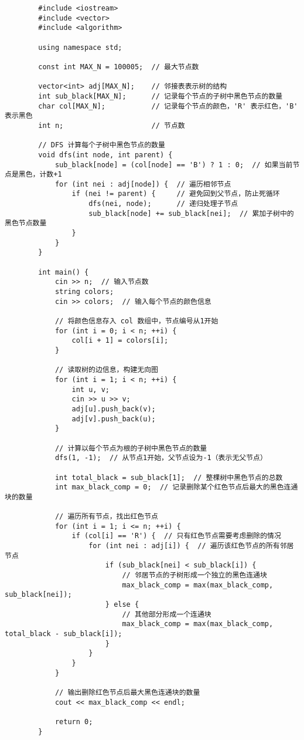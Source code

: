 \documentclass[a4paper]{ctexart}
\begin{document}
	\begin{lstlisting}
		#include <iostream>
		#include <vector>
		#include <algorithm>
		
		using namespace std;
		
		const int MAX_N = 100005;  // 最大节点数
		
		vector<int> adj[MAX_N];    // 邻接表表示树的结构
		int sub_black[MAX_N];      // 记录每个节点的子树中黑色节点的数量
		char col[MAX_N];           // 记录每个节点的颜色，'R' 表示红色，'B' 表示黑色
		int n;                     // 节点数
		
		// DFS 计算每个子树中黑色节点的数量
		void dfs(int node, int parent) {
			sub_black[node] = (col[node] == 'B') ? 1 : 0;  // 如果当前节点是黑色，计数+1
			for (int nei : adj[node]) {  // 遍历相邻节点
				if (nei != parent) {     // 避免回到父节点，防止死循环
					dfs(nei, node);      // 递归处理子节点
					sub_black[node] += sub_black[nei];  // 累加子树中的黑色节点数量
				}
			}
		}
		
		int main() {
			cin >> n;  // 输入节点数
			string colors;
			cin >> colors;  // 输入每个节点的颜色信息
			
			// 将颜色信息存入 col 数组中，节点编号从1开始
			for (int i = 0; i < n; ++i) {
				col[i + 1] = colors[i]; 
			}
			
			// 读取树的边信息，构建无向图
			for (int i = 1; i < n; ++i) {
				int u, v;
				cin >> u >> v;
				adj[u].push_back(v);
				adj[v].push_back(u);
			}
			
			// 计算以每个节点为根的子树中黑色节点的数量
			dfs(1, -1);  // 从节点1开始，父节点设为-1（表示无父节点）
			
			int total_black = sub_black[1];  // 整棵树中黑色节点的总数
			int max_black_comp = 0;  // 记录删除某个红色节点后最大的黑色连通块的数量
			
			// 遍历所有节点，找出红色节点
			for (int i = 1; i <= n; ++i) {
				if (col[i] == 'R') {  // 只有红色节点需要考虑删除的情况
					for (int nei : adj[i]) {  // 遍历该红色节点的所有邻居节点
						if (sub_black[nei] < sub_black[i]) {
							// 邻居节点的子树形成一个独立的黑色连通块
							max_black_comp = max(max_black_comp, sub_black[nei]);
						} else {
							// 其他部分形成一个连通块
							max_black_comp = max(max_black_comp, total_black - sub_black[i]);
						}
					}
				}
			}
			
			// 输出删除红色节点后最大黑色连通块的数量
			cout << max_black_comp << endl;
			
			return 0;
		}
		
	\end{lstlisting}
	
	
\end{document}
